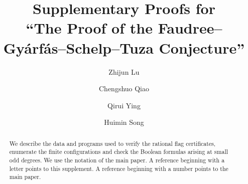 \documentclass[preprint,11pt,numbers]{elsarticle-arxiv}
\newcommand{\articletitle}{The Proof of the Faudree--Gy\'arf\'as--Schelp--Tuza Conjecture}
\begin{document}
\begin{frontmatter}
\title{\textbf{\Large Supplementary Proofs for\\\textquotedblleft\articletitle\textquotedblright}}
\author[1]{Zhijun Lu}
\author[1]{Chengshuo Qiao}
\author[1]{Qirui Ying}
\author[1]{Huimin Song}
\begin{abstract}
We describe the data and programs used to verify the rational flag
certificates, enumerate the finite configurations and check the
Boolean formulas arising at small odd degrees. We use the notation
of the main paper. A reference beginning with a letter points to this
supplement. A reference beginning with a number points to the main paper.
\end{abstract}
\end{frontmatter}
\thispagestyle{plain}

\tableofcontents

\end{document}
